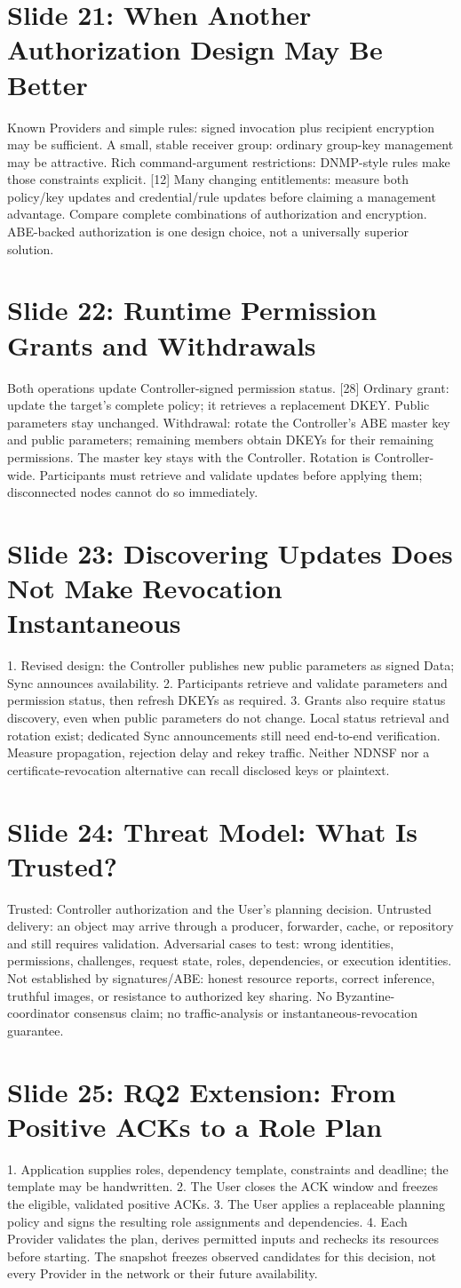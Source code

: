 \documentclass[11pt]{article}
\newcommand{\slideentry}[3]{\section*{Slide #1: #2}#3\par}
\begin{document}
\slideentry{21}{When Another Authorization Design May Be Better}{
Known Providers and simple rules: signed invocation plus recipient encryption may be sufficient. A small, stable receiver group: ordinary group-key management may be attractive. Rich command-argument restrictions: DNMP-style rules make those constraints explicit. [12] Many changing entitlements: measure both policy/key updates and credential/rule updates before claiming a management advantage. Compare complete combinations of authorization and encryption. ABE-backed authorization is one design choice, not a universally superior solution.
}
\slideentry{22}{Runtime Permission Grants and Withdrawals}{
Both operations update Controller-signed permission status. [28] Ordinary grant: update the target’s complete policy; it retrieves a replacement DKEY. Public parameters stay unchanged. Withdrawal: rotate the Controller’s ABE master key and public parameters; remaining members obtain DKEYs for their remaining permissions. The master key stays with the Controller. Rotation is Controller-wide. Participants must retrieve and validate updates before applying them; disconnected nodes cannot do so immediately.
}
\slideentry{23}{Discovering Updates Does Not Make Revocation Instantaneous}{
1. Revised design: the Controller publishes new public parameters as signed Data; Sync announces availability. 2. Participants retrieve and validate parameters and permission status, then refresh DKEYs as required. 3. Grants also require status discovery, even when public parameters do not change. Local status retrieval and rotation exist; dedicated Sync announcements still need end-to-end verification. Measure propagation, rejection delay and rekey traffic. Neither NDNSF nor a certificate-revocation alternative can recall disclosed keys or plaintext.
}
\slideentry{24}{Threat Model: What Is Trusted?}{
Trusted: Controller authorization and the User’s planning decision. Untrusted delivery: an object may arrive through a producer, forwarder, cache, or repository and still requires validation. Adversarial cases to test: wrong identities, permissions, challenges, request state, roles, dependencies, or execution identities. Not established by signatures/ABE: honest resource reports, correct inference, truthful images, or resistance to authorized key sharing. No Byzantine-coordinator consensus claim; no traffic-analysis or instantaneous-revocation guarantee.
}
\slideentry{25}{RQ2 Extension: From Positive ACKs to a Role Plan}{
1. Application supplies roles, dependency template, constraints and deadline; the template may be handwritten. 2. The User closes the ACK window and freezes the eligible, validated positive ACKs. 3. The User applies a replaceable planning policy and signs the resulting role assignments and dependencies. 4. Each Provider validates the plan, derives permitted inputs and rechecks its resources before starting. The snapshot freezes observed candidates for this decision, not every Provider in the network or their future availability.
}
\end{document}
